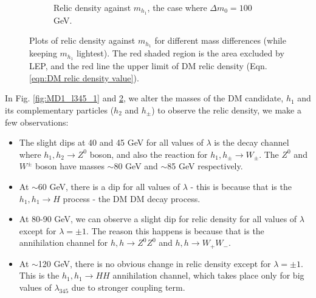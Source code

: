 \documentclass[12pt]{article}
\begin{document}
\begin{figure}[ht]
\begin{subfigure}[b]{0.49\textwidth}
        \caption{Relic density against $m_{h_1}$, the case where $\Delta m_0 = 100$ GeV.}
        \label{fig:MD1_l345_100}
    \end{subfigure}
    \caption{Plots of relic density against $m_{h_1}$ for different mass differences (while keeping $m_{h_1}$ lightest). The red shaded region is the area excluded by LEP, and the red line the upper limit of DM relic density (Eqn. \ref{eqn:DM relic density value}).}
\end{figure}

In Fig. \ref{fig:MD1_l345_1} and \ref{fig:MD1_l345_100}, we alter the masses of the DM candidate, $h_1$ and its complementary particles ($h_2$ and $h_{\pm}$) to observe the relic density, we make a few observations:
\begin{itemize}
    \item The slight dips at 40 and 45 GeV for all values of $\lambda$ is the decay channel where $h_1, h_2 \rightarrow Z^0$ boson, and also the reaction for $h_1, h_{\pm} \rightarrow W_\pm$. The $Z^0$ and $W^\pm$ boson have masses $\sim$80 GeV and $\sim$85 GeV respectively.
    \item At $\sim$60 GeV, there is a dip for all values of $\lambda$ - this is because that is the $h_1,h_1\rightarrow H$ process - the DM DM decay process. 
    \item At 80-90 GeV, we can observe a slight dip for relic density for all values of $\lambda$ except for $\lambda = \pm1$. The reason this happens is because that is the annihilation channel for $h, h \rightarrow Z^0Z^0$ and $h, h \rightarrow W_+ W_-$.
    \item At $\sim$120 GeV, there is no obvious change in relic density except for $\lambda = \pm1$. This is the $h_1,h_1\rightarrow H H$ annihilation channel, which takes place only for big values of $\lambda_{345}$ due to stronger coupling term.
\end{itemize}
\end{document}
